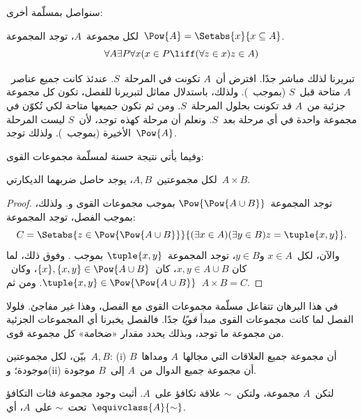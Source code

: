 \documentclass[../../../include/open-logic-section]{subfiles}
\begin{document}

سنواصل بمسلّمة أخرى:

\begin{axiom}
لكل مجموعة~$A$، توجد المجموعة~$\Pow{A} = \Setabs{x}{x \subseteq A}$.
\[
	\forall A \exists P \forall x(x \in P \liff (\forall z \in x)z \in A)
\]
\end{axiom}

تبريرنا لذلك مباشر جدًا. افترض أن~$A$ تكونت في المرحلة~$S$. عندئذ
كانت جميع عناصر~$A$ متاحة قبل~$S$ (بموجب~\stagesacc). ولذلك، باستدلال
مماثل لتبريرنا للفصل، تكون كل مجموعة جزئية من~$A$ قد تكونت بحلول
المرحلة~$S$. ومن ثم تكون جميعها متاحة لكي تُكوّن في مجموعة واحدة في
أي مرحلة بعد~$S$. ونعلم أن مرحلة كهذه توجد، لأن~$S$ ليست المرحلة
الأخيرة (بموجب~\stagessucc). ولذلك توجد~$\Pow{A}$.

وفيما يأتي نتيجة حسنة لمسلّمة مجموعات القوى:

\begin{prop}\label{thm:Products}
لكل مجموعتين~$A,B$، يوجد حاصل ضربهما الديكارتي~$A \times B$.
\end{prop}

\begin{proof}
توجد المجموعة~$\Pow{\Pow{A \cup B}}$ بموجب مجموعات القوى
و. ولذلك، بموجب الفصل،
توجد المجموعة:
\[
	C = \Setabs{z \in \Pow{\Pow{A \cup B}}}{(\exists x \in A)(\exists y \in B) z = \tuple{x, y}}.
\]
والآن، لكل~$x \in A$ و$y \in B$، توجد المجموعة~$\tuple{x,y}$ بموجب
. وفوق ذلك، لما كان
$x,y \in A \cup B$، كان~$\{x\},\{x,y\} \in \Pow{A \cup B}$،
وكان~$\tuple{x,y} \in \Pow{\Pow{A \cup B}}$. ومن ثم~$A \times B = C$.
\end{proof}

في هذا البرهان تتفاعل مسلّمة مجموعات القوى مع الفصل، وهذا غير مفاجئ.
فلولا الفصل لما كانت مجموعات القوى مبدأ \emph{قويًا} جدًا. فالفصل
يخبرنا أي المجموعات الجزئية من مجموعة ما توجد، وبذلك يحدد مقدار «ضخامة»
كل مجموعة قوى.

\begin{prob}
بيّن، لكل مجموعتين~$A,B$: (i) أن مجموعة جميع العلاقات التي مجالها~$A$
ومداها~$B$ موجودة؛ و(ii) أن مجموعة جميع الدوال من~$A$ إلى~$B$ موجودة.
\end{prob}

\begin{prob}
لتكن~$A$ مجموعة، ولتكن~$\sim$ علاقة تكافؤ على~$A$. أثبت وجود مجموعة
فئات التكافؤ تحت~$\sim$ على~$A$، أي~$\equivclass{A}{\sim}$.
\end{prob}
\end{document}
